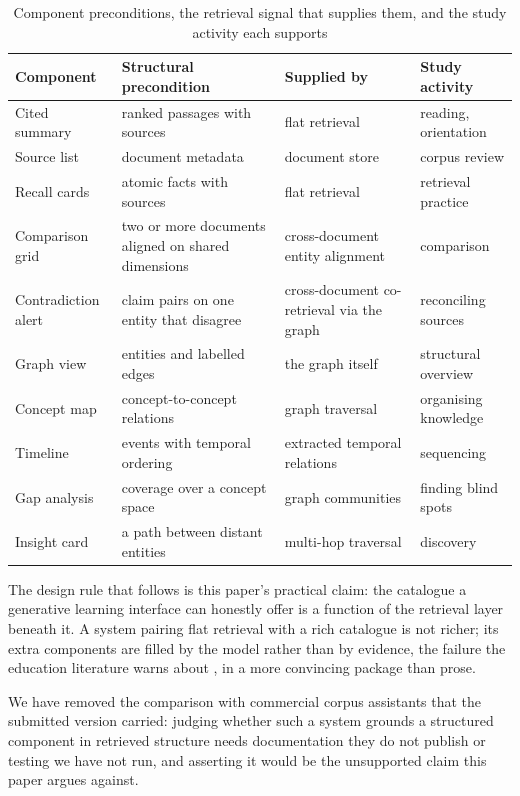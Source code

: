 \documentclass[conference]{IEEEtran}
\newcommand{\tbl}{\footnotesize}
\begin{document}
\begin{table}[t]
\caption{Component preconditions, the retrieval signal that supplies them, and the study activity each supports}
\label{tab:bound}
\centering
\tbl
\begin{tabular}{@{}p{}p{}p{}p{}@{}}
\toprule
\textbf{Component} & \textbf{Structural precondition} & \textbf{Supplied by} & \textbf{Study activity} \\
\midrule
Cited summary & ranked passages with sources & flat retrieval & reading, orientation \\
Source list & document metadata & document store & corpus review \\
Recall cards & atomic facts with sources & flat retrieval & retrieval practice \\
Comparison grid & two or more documents aligned on shared dimensions & cross-document entity alignment & comparison \\
Contradiction alert & claim pairs on one entity that disagree & cross-document co-retrieval via the graph & reconciling sources \\
Graph view & entities and labelled edges & the graph itself & structural overview \\
Concept map & concept-to-concept relations & graph traversal & organising knowledge \\
Timeline & events with temporal ordering & extracted temporal relations & sequencing \\
Gap analysis & coverage over a concept space & graph communities & finding blind spots \\
Insight card & a path between distant entities & multi-hop traversal & discovery \\
\bottomrule
\end{tabular}
\end{table}

The design rule that follows is this paper's practical claim: the catalogue a generative learning interface can honestly offer is a function of the retrieval layer beneath it. A system pairing flat retrieval with a rich catalogue is not richer; its extra components are filled by the model rather than by evidence, the failure the education literature warns about \cite{ref:eduevaldb,ref:neshaei}, in a more convincing package than prose.

We have removed the comparison with commercial corpus assistants that the submitted version carried: judging whether such a system grounds a structured component in retrieved structure needs documentation they do not publish or testing we have not run, and asserting it would be the unsupported claim this paper argues against.
\end{document}
